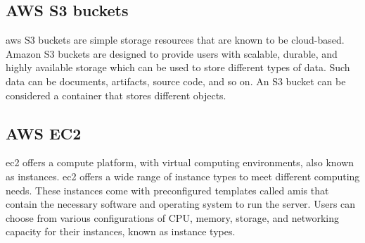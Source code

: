 \subsection{AWS S3 buckets}
\acrshort{aws} S3 buckets are simple storage resources that are known to be cloud-based. Amazon S3 buckets are designed to provide users with scalable, durable, and highly available storage which can be used to store different types of data. Such data can be documents, artifacts, source code, and so on. An S3 bucket can be considered a container that stores different objects. \cite{S3Bucket}

\subsection{AWS EC2}
\acrlong{ec2} offers a \gls{compute platform}, with virtual computing environments, also known as instances. \acrlong{ec2} offers a wide range of instance types to meet different computing needs. These instances come with preconfigured templates called \acrlong{amis} that contain the necessary software and operating system to run the server. Users can choose from various configurations of CPU, memory, storage, and networking capacity for their instances, known as instance types.\cite{awsec2}



